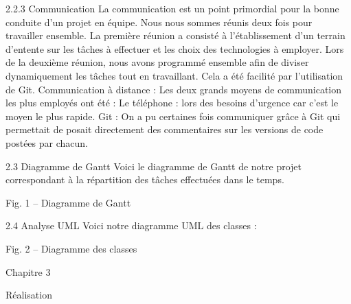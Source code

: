 \documentclass[a4paper,french,towsides,10pt]{book}
\begin{document}
2.2.3 Communication
La communication est un point primordial pour la bonne conduite d’un projet en équipe.
Nous nous sommes réunis deux fois pour travailler ensemble.
La première réunion a consisté à l’établissement d’un terrain d’entente sur les tâches à effectuer et les choix des technologies à employer.
Lors de la deuxième réunion, nous avons programmé ensemble afin de diviser dynamiquement les tâches tout en travaillant. Cela a été facilité par l’utilisation de Git.
Communication à distance :
Les deux grands moyens de communication les plus employés ont été :
Le téléphone : lors des besoins d’urgence car c’est le moyen le plus rapide.
Git : On a pu certaines fois communiquer grâce à Git qui permettait de posait directement des commentaires sur les versions de code postées par chacun.

2.3 Diagramme de Gantt
Voici le diagramme de Gantt de notre projet correspondant à la répartition des tâches effectuées dans le temps.

Fig. 1 – Diagramme de Gantt





2.4 Analyse UML
Voici notre diagramme UML des classes :

Fig. 2 – Diagramme des classes









Chapitre 3

Réalisation
\end{document}

